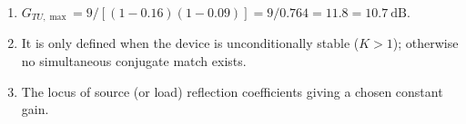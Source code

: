 \begin{enumerate}[leftmargin=1.6em,itemsep=2pt]
\item $G_{TU,\max} = 9/[(1-0.16)(1-0.09)] = 9/0.764 = 11.8 = 10.7\ \text{dB}$.
\item It is only defined when the device is unconditionally stable ($K>1$); otherwise no simultaneous conjugate match exists.
\item The locus of source (or load) reflection coefficients giving a chosen constant gain.
\end{enumerate}
